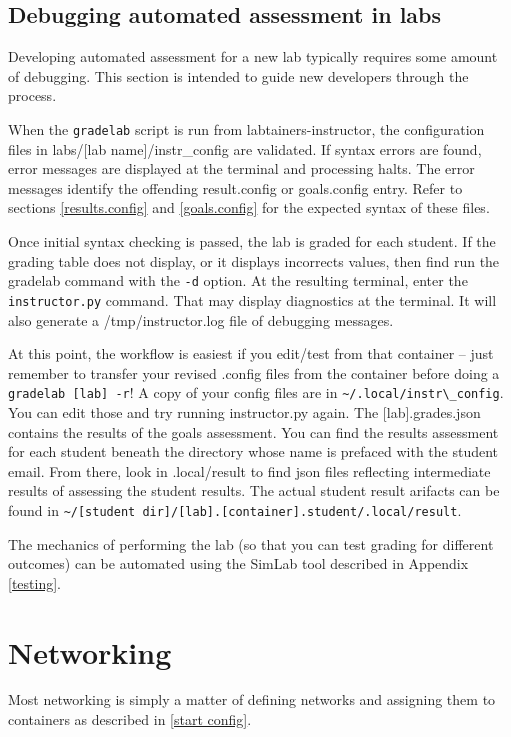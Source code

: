 \documentclass[12pt]{article}
\begin{document}
\subsection{Debugging automated assessment in labs}
Developing automated assessment for a new lab typically requires some
amount of debugging.  This section is intended to guide new developers
through the process.

When the {\tt gradelab} script is run from labtainers-instructor,
the configuration files in labs/[lab name]/instr\_config are validated.
If syntax errors are found, error messages are displayed at the terminal
and processing halts.  The error messages identify the offending result.config
or goals.config entry.  Refer to sections \ref{results.config} and \ref{goals.config} 
for the expected syntax of these files.

Once initial syntax checking is passed, the lab is graded for each student.
If the grading table does not display, or it displays
incorrects values, then find run the gradelab command with the {\tt -d} option.
At the resulting terminal, enter the {\tt instructor.py}
command.  That may display diagnostics at the terminal.  It will also generate
a /tmp/instructor.log file of debugging messages. 

At this point, the workflow is easiest if you edit/test from that container --
just remember to transfer your revised .config files from the container before
doing a {\tt gradelab [lab] -r}!  A copy of your config files are in \verb!~/.local/instr\_config!.  You can edit
those and try running instructor.py again.  The [lab].grades.json contains the
results of the goals assessment.  You can find the results assessment for each 
student beneath the directory whose name is prefaced with the student email.  
From there, look in .local/result to find json files reflecting intermediate 
results of assessing the student results.  The actual student result arifacts
can be found in \verb!~/[student dir]/[lab].[container].student/.local/result!. 

The mechanics of performing the lab (so that you can test grading for different outcomes)
can be automated using the SimLab tool described in Appendix \ref{testing}.

\section{Networking} \label{networking}
Most networking is simply a matter of defining networks and assigning them to containers
as described in \ref{start config}.  
\end{document}
